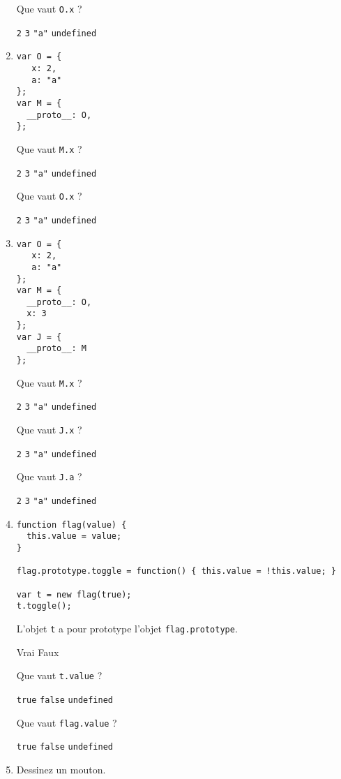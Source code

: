 \documentclass[a4paper, 12pt]{article}
\newcommand{\choice}[1]{\Square\hspace{2pt} #1\hspace{5pt}}
\newcommand{\choicec}[1]{\Square\hspace{2pt} \lstinline{#1}\hspace{5pt}}
\begin{document}
\begin{enumerate}
  Que vaut \lstinline{O.x} ?

  \choicec{2} \choicec{3} \choicec{"a"} \choicec{undefined}
\item \lstset{language=javascript}
\begin{lstlisting}
var O = {
   x: 2,
   a: "a"
};
var M = {
  __proto__: O,
};
\end{lstlisting}

  Que vaut \lstinline{M.x} ?

  \choicec{2} \choicec{3} \choicec{"a"} \choicec{undefined}

  Que vaut \lstinline{O.x} ?

  \choicec{2} \choicec{3} \choicec{"a"} \choicec{undefined}
\item \lstset{language=javascript}
\begin{lstlisting}
var O = {
   x: 2,
   a: "a"
};
var M = {
  __proto__: O,
  x: 3
};
var J = {
  __proto__: M
};
\end{lstlisting}

  Que vaut \lstinline{M.x} ?

  \choicec{2} \choicec{3} \choicec{"a"} \choicec{undefined}

  Que vaut \lstinline{J.x} ?

  \choicec{2} \choicec{3} \choicec{"a"} \choicec{undefined}

  Que vaut \lstinline{J.a} ?

  \choicec{2} \choicec{3} \choicec{"a"} \choicec{undefined}
\item \lstset{language=javascript}
\begin{lstlisting}
function flag(value) {
  this.value = value;
}

flag.prototype.toggle = function() { this.value = !this.value; }

var t = new flag(true);
t.toggle();
\end{lstlisting}

  L'objet \lstinline{t} a pour prototype l'objet
  \lstinline{flag.prototype}.

  \choice{Vrai} \choice{Faux}

  Que vaut \lstinline{t.value} ?

  \choicec{true} \choicec{false} \choicec{undefined}

  Que vaut \lstinline{flag.value} ?

  \choicec{true} \choicec{false} \choicec{undefined}
\item Dessinez un mouton.
\end{enumerate}
\end{document}
